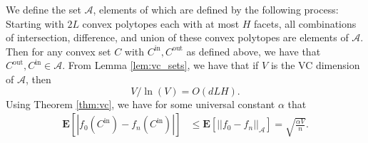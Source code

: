 \documentclass[final,12pt]{colt2018}
\newtheorem{informal theorem}[theorem]{Theorem (informal statement)}
\newcommand{\E}{\mathbf{E}}
\newcommand{\eps}{\epsilon}
\newcommand{\cin}{C^\mathrm{in}}
\newcommand{\cout}{C^\mathrm{out}}
\begin{document}
We define the set $\mathcal{A}$, elements of which are defined by the following process: Starting with $2L$ convex polytopes each with at most $H$ facets, all combinations of intersection, difference, and union of these convex polytopes are elements of $\mathcal{A}$.
Then for any convex set $C$ with $\cin, \cout$ as defined above, we have that $\cout, \cin \in \mathcal{A}$.
From Lemma \ref{lem:vc_sets}, we have that if $V$ is the VC dimension of $\mathcal{A}$, then
\[
V/\ln(V) = O(d L H).
\]
Using Theorem \ref{thm:vc}, we have  {for some universal constant $\alpha$} that 
\begin{align}
\E[|f_0(\cin) - f_n(\cin)|] &\leq \E[||f_0 - f_n||_\mathcal{A}] = \sqrt{\frac{ {\alpha V}}{n}}. \label{eq:hard_vc}
\end{align}
\end{document}
